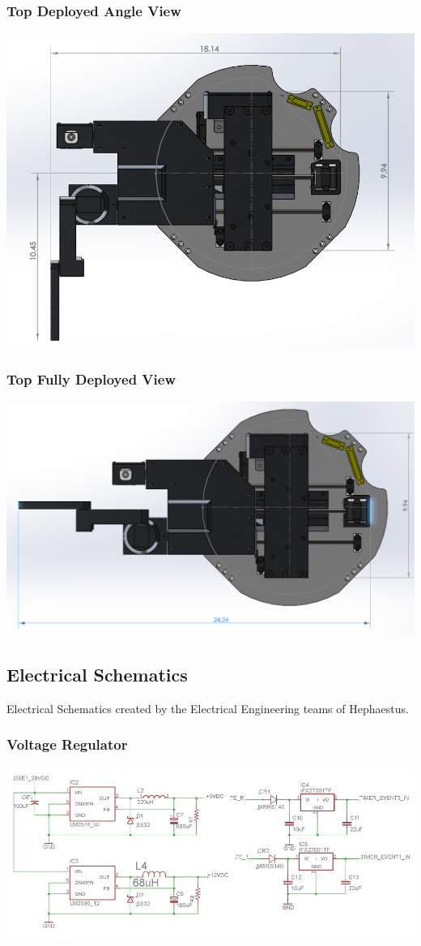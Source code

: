 \subsubsection{Top Deployed Angle View}
\includegraphics[width=\textwidth]{./images/CAD/TOP_DEPLOYED_ANGLE}
\subsubsection{Top Fully Deployed View}
\includegraphics[width=\textwidth]{./images/CAD/TOP_DEPLOYED_FULL}

\subsection{Electrical Schematics}
Electrical Schematics created by the Electrical Engineering teams of Hephaestus.
\subsubsection{Voltage Regulator}
\includegraphics[width=\textwidth]{./images/EESchems/voltageRegulator}
